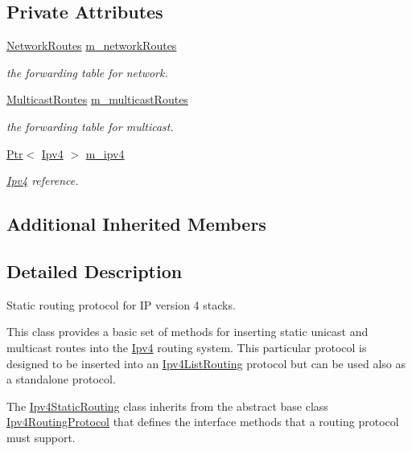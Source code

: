 \subsection*{Private Attributes}
\begin{DoxyCompactItemize}
\item 
\hyperlink{classns3_1_1Ipv4StaticRouting_ac3eb49f971bae7619f69b21dffb93078}{Network\+Routes} \hyperlink{classns3_1_1Ipv4StaticRouting_a81e0b111629b14fff2efbf69180a64c1}{m\+\_\+network\+Routes}
\begin{DoxyCompactList}\small\item\em the forwarding table for network. \end{DoxyCompactList}\item 
\hyperlink{classns3_1_1Ipv4StaticRouting_a8ed35ab38cf9627ef4f80b06d3ce6531}{Multicast\+Routes} \hyperlink{classns3_1_1Ipv4StaticRouting_a5aaf2ee73a6590cc164ac9485d89b538}{m\+\_\+multicast\+Routes}
\begin{DoxyCompactList}\small\item\em the forwarding table for multicast. \end{DoxyCompactList}\item 
\hyperlink{classns3_1_1Ptr}{Ptr}$<$ \hyperlink{classns3_1_1Ipv4}{Ipv4} $>$ \hyperlink{classns3_1_1Ipv4StaticRouting_adc30356be1824ea40ffbd444a5d91b9f}{m\+\_\+ipv4}
\begin{DoxyCompactList}\small\item\em \hyperlink{classns3_1_1Ipv4}{Ipv4} reference. \end{DoxyCompactList}\end{DoxyCompactItemize}
\subsection*{Additional Inherited Members}


\subsection{Detailed Description}
Static routing protocol for IP version 4 stacks. 

This class provides a basic set of methods for inserting static unicast and multicast routes into the \hyperlink{classns3_1_1Ipv4}{Ipv4} routing system. This particular protocol is designed to be inserted into an \hyperlink{classns3_1_1Ipv4ListRouting}{Ipv4\+List\+Routing} protocol but can be used also as a standalone protocol.

The \hyperlink{classns3_1_1Ipv4StaticRouting}{Ipv4\+Static\+Routing} class inherits from the abstract base class \hyperlink{classns3_1_1Ipv4RoutingProtocol}{Ipv4\+Routing\+Protocol} that defines the interface methods that a routing protocol must support.

